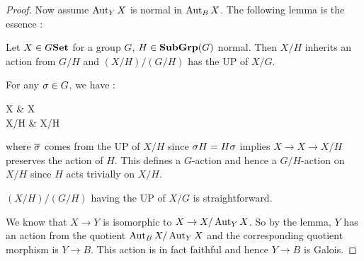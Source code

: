 \documentclass[./main.tex]{subfiles}
\begin{document}
\begin{proof}
  Now assume $\operatorname{Aut}_Y X$ is normal in $\operatorname{Aut}_B X$.
  The following lemma is the essence : 
  \begin{lem}
    
    Let $X \in G\mathbf{Set}$ for a group $G$, $H \in \mathbf{Sub}\mathbf{Grp}(G)$ normal.
    Then $X/H$ inherits an action from $G/H$ and 
    $(X/H)/(G/H)$ has the UP of $X/G$.
    \begin{proof1}
      For any $\sigma \in G$,
      we have : 
      \begin{cd}
        X \ar[r,"\si"] \ar[d] & X \ar[d] \\
        X/H \ar[r,"\bar{\si}"] & X/H
      \end{cd}
      where $\overline{\sigma}$ comes from the UP of $X/H$
      since $\sigma H = H \sigma$ implies $X \to X \to X/H$ 
      preserves the action of $H$.
      This defines a $G$-action and hence a $G/H$-action on $X/H$
      since $H$ acts trivially on $X/H$.

      $(X/H)/(G/H)$ having the UP of $X/G$ is straightforward.
    \end{proof1}
  \end{lem}
  We know that $X \to Y$ is isomorphic to $X \to X/\operatorname{Aut}_Y X$.
  So by the lemma, $Y$ has an action from the quotient $\operatorname{Aut}_B X / \operatorname{Aut}_Y X$
  and the corresponding quotient morphism is $Y \to B$.
  This action is in fact faithful and hence 
  $Y \to B$ is Galois. 

\end{proof}
\end{document}
